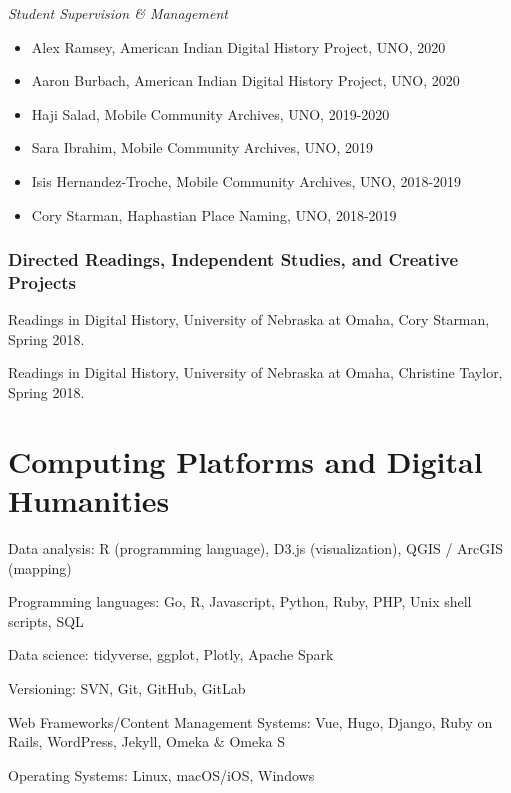 \emph{Student Supervision \& Management}

\begin{itemize}
\tightlist
\item
  Alex Ramsey, American Indian Digital History Project, UNO, 2020
\item
  Aaron Burbach, American Indian Digital History Project, UNO, 2020
\item
  Haji Salad, Mobile Community Archives, UNO, 2019-2020
\item
  Sara Ibrahim, Mobile Community Archives, UNO, 2019
\item
  Isis Hernandez-Troche, Mobile Community Archives, UNO, 2018-2019
\item
  Cory Starman, Haphastian Place Naming, UNO, 2018-2019
\end{itemize}

\hypertarget{directed-readings-independent-studies-and-creative-projects}{%
\subsubsection{Directed Readings, Independent Studies, and Creative
Projects}\label{directed-readings-independent-studies-and-creative-projects}}

Readings in Digital History, University of Nebraska at Omaha, Cory
Starman, Spring 2018.

Readings in Digital History, University of Nebraska at Omaha, Christine
Taylor, Spring 2018.

\hypertarget{computing-platforms-and-digital-humanities}{%
\section{Computing Platforms and Digital
Humanities}\label{computing-platforms-and-digital-humanities}}

Data analysis: R (programming language), D3.js (visualization), QGIS /
ArcGIS (mapping)

Programming languages: Go, R, Javascript, Python, Ruby, PHP, Unix shell
scripts, SQL

Data science: tidyverse, ggplot, Plotly, Apache Spark

Versioning: SVN, Git, GitHub, GitLab

Web Frameworks/Content Management Systems: Vue, Hugo, Django, Ruby on
Rails, WordPress, Jekyll, Omeka \& Omeka S

Operating Systems: Linux, macOS/iOS, Windows

